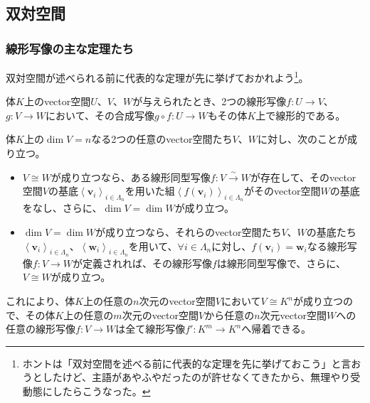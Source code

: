 \documentclass[dvipdfmx]{jsarticle}
\begin{document}
\subsection{双対空間}%
\subsubsection{線形写像の主な定理たち}%
双対空間が述べられる前に代表的な定理が先に挙げておかれよう\footnote{ホントは「双対空間を述べる前に代表的な定理を先に挙げておこう」と言おうとしたけど、主語があやふやだったのが許せなくてきたから、無理やり受動態にしたらこうなった。}。
\begin{thm*}
体$K$上のvector空間$U$、$V$、$W$が与えられたとき、2つの線形写像$f:U \rightarrow V$、$g:V \rightarrow W$において、その合成写像$g \circ f:U \rightarrow W$もその体$K$上で線形的である。
\end{thm*}
\begin{thm*}
体$K$上の$\dim V = n$なる2つの任意のvector空間たち$V$、$W$に対し、次のことが成り立つ。
\begin{itemize}
\item
  $V \cong W$が成り立つなら、ある線形同型写像$f:V\overset{\sim}{\rightarrow}W$が存在して、そのvector空間$V$の基底$\left\langle \mathbf{v}_{i} \right\rangle_{i \in \varLambda_{n}}$を用いた組$\left\langle f\left( \mathbf{v}_{i} \right) \right\rangle_{i \in \varLambda_{n}}$がそのvector空間$W$の基底をなし、さらに、$\dim V = \dim W$が成り立つ。
\item
  $\dim V = \dim W$が成り立つなら、それらのvector空間たち$V$、$W$の基底たち$\left\langle \mathbf{v}_{i} \right\rangle_{i \in \varLambda_{n}}$、$\left\langle \mathbf{w}_{i} \right\rangle_{i \in \varLambda_{n}}$を用いて、$\forall i \in \varLambda_{n}$に対し、$f\left( \mathbf{v}_{i} \right) = \mathbf{w}_{i}$なる線形写像$f:V \rightarrow W$が定義されれば、その線形写像$f$は線形同型写像で、さらに、$V \cong W$が成り立つ。
\end{itemize}\par
これにより、体$K$上の任意の$n$次元のvector空間$V$において$V \cong K^{n}$が成り立つので、その体$K$上の任意の$m$次元のvector空間$V$から任意の$n$次元vector空間$W$への任意の線形写像$f:V \rightarrow W$は全て線形写像$f':K^{m} \rightarrow K^{n}$へ帰着できる。
\end{thm*}
\end{document}
